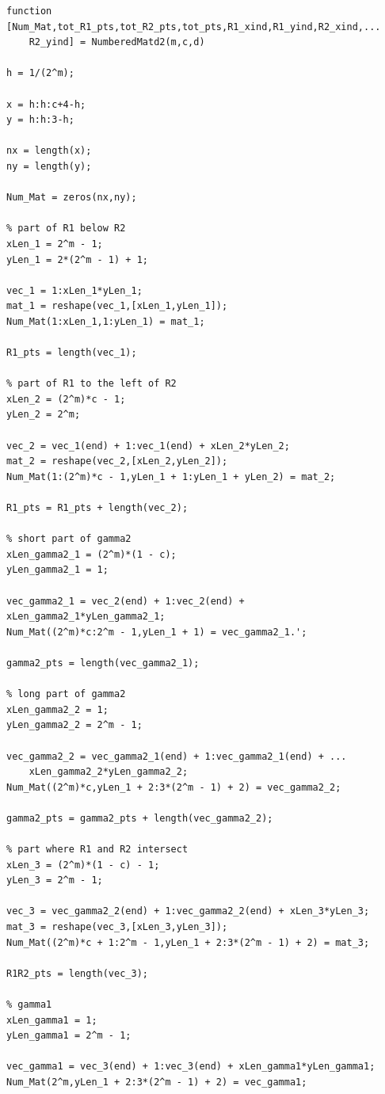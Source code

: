 \documentclass[12pt]{article}
\begin{document}
\lstset{language=matlab,frame=single}
\begin{lstlisting}[caption=Enumeration for b equals 2]
function [Num_Mat,tot_R1_pts,tot_R2_pts,tot_pts,R1_xind,R1_yind,R2_xind,...
    R2_yind] = NumberedMatd2(m,c,d)

h = 1/(2^m);

x = h:h:c+4-h;
y = h:h:3-h;

nx = length(x);
ny = length(y);

Num_Mat = zeros(nx,ny);

% part of R1 below R2
xLen_1 = 2^m - 1; 
yLen_1 = 2*(2^m - 1) + 1; 

vec_1 = 1:xLen_1*yLen_1;
mat_1 = reshape(vec_1,[xLen_1,yLen_1]);
Num_Mat(1:xLen_1,1:yLen_1) = mat_1;

R1_pts = length(vec_1);

% part of R1 to the left of R2
xLen_2 = (2^m)*c - 1; 
yLen_2 = 2^m; 

vec_2 = vec_1(end) + 1:vec_1(end) + xLen_2*yLen_2;
mat_2 = reshape(vec_2,[xLen_2,yLen_2]);
Num_Mat(1:(2^m)*c - 1,yLen_1 + 1:yLen_1 + yLen_2) = mat_2;

R1_pts = R1_pts + length(vec_2);

% short part of gamma2
xLen_gamma2_1 = (2^m)*(1 - c);
yLen_gamma2_1 = 1;

vec_gamma2_1 = vec_2(end) + 1:vec_2(end) + xLen_gamma2_1*yLen_gamma2_1;
Num_Mat((2^m)*c:2^m - 1,yLen_1 + 1) = vec_gamma2_1.';

gamma2_pts = length(vec_gamma2_1);

% long part of gamma2
xLen_gamma2_2 = 1;
yLen_gamma2_2 = 2^m - 1;

vec_gamma2_2 = vec_gamma2_1(end) + 1:vec_gamma2_1(end) + ...
    xLen_gamma2_2*yLen_gamma2_2;
Num_Mat((2^m)*c,yLen_1 + 2:3*(2^m - 1) + 2) = vec_gamma2_2;

gamma2_pts = gamma2_pts + length(vec_gamma2_2);

% part where R1 and R2 intersect
xLen_3 = (2^m)*(1 - c) - 1;
yLen_3 = 2^m - 1;

vec_3 = vec_gamma2_2(end) + 1:vec_gamma2_2(end) + xLen_3*yLen_3;
mat_3 = reshape(vec_3,[xLen_3,yLen_3]);
Num_Mat((2^m)*c + 1:2^m - 1,yLen_1 + 2:3*(2^m - 1) + 2) = mat_3;

R1R2_pts = length(vec_3);

% gamma1
xLen_gamma1 = 1;
yLen_gamma1 = 2^m - 1;

vec_gamma1 = vec_3(end) + 1:vec_3(end) + xLen_gamma1*yLen_gamma1;
Num_Mat(2^m,yLen_1 + 2:3*(2^m - 1) + 2) = vec_gamma1;


\end{lstlisting}
\end{document}
